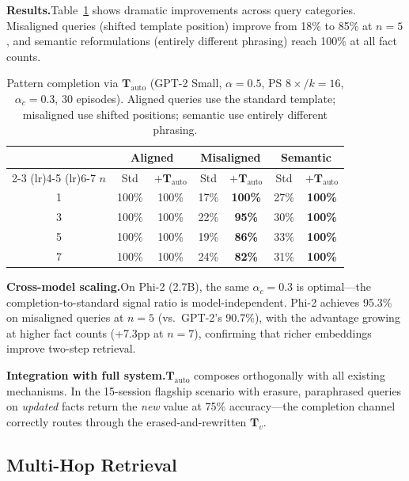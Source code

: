 \documentclass[11pt,a4paper]{article}
\begin{document}
\textbf{Results.}\quad Table~\ref{tab:tauto} shows dramatic improvements across query categories. Misaligned queries (shifted template position) improve from 18\% to 85\% at $n{=}5$, and semantic reformulations (entirely different phrasing) reach 100\% at all fact counts.

\begin{table}[t]
  \centering
  \caption{Pattern completion via $\mathbf{T}_{\text{auto}}$ (GPT-2 Small, $\alpha{=}0.5$, PS $8\times/k{=}16$, $\alpha_c{=}0.3$, 30 episodes). Aligned queries use the standard template; misaligned use shifted positions; semantic use entirely different phrasing.}
  \label{tab:tauto}
  \begin{tabular}{@{}ccccccc@{}}
    \toprule
    & \multicolumn{2}{c}{Aligned} & \multicolumn{2}{c}{Misaligned} & \multicolumn{2}{c}{Semantic} \\
    \cmidrule(lr){2-3} \cmidrule(lr){4-5} \cmidrule(lr){6-7}
    $n$ & Std & $+\mathbf{T}_{\text{auto}}$ & Std & $+\mathbf{T}_{\text{auto}}$ & Std & $+\mathbf{T}_{\text{auto}}$ \\
    \midrule
    1 & 100\% & 100\% & 17\% & \textbf{100\%} & 27\% & \textbf{100\%} \\
    3 & 100\% & 100\% & 22\% & \textbf{95\%} & 30\% & \textbf{100\%} \\
    5 & 100\% & 100\% & 19\% & \textbf{86\%} & 33\% & \textbf{100\%} \\
    7 & 100\% & 100\% & 24\% & \textbf{82\%} & 31\% & \textbf{100\%} \\
    \bottomrule
  \end{tabular}
\end{table}

\textbf{Cross-model scaling.}\quad On Phi-2 (2.7B), the same $\alpha_c{=}0.3$ is optimal---the completion-to-standard signal ratio is model-independent. Phi-2 achieves 95.3\% on misaligned queries at $n{=}5$ (vs.\ GPT-2's 90.7\%), with the advantage growing at higher fact counts (+7.3pp at $n{=}7$), confirming that richer embeddings improve two-step retrieval.

\textbf{Integration with full system.}\quad $\mathbf{T}_{\text{auto}}$ composes orthogonally with all existing mechanisms. In the 15-session flagship scenario with erasure, paraphrased queries on \emph{updated} facts return the \emph{new} value at 75\% accuracy---the completion channel correctly routes through the erased-and-rewritten $\mathbf{T}_v$.

\subsection{Multi-Hop Retrieval}
\label{sec:multihop_exp}
\end{document}
